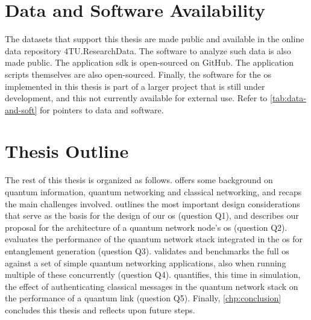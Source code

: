 \section{Data and Software Availability}

The datasets that support this thesis are made public and available in the online data repository
4TU.ResearchData. The software to analyze such data is also made public. The application
\acrfull{sdk} is open-sourced on GitHub. The application scripts themselves are also open-sourced.
Finally, the software for the \acrlong{os} implemented in this thesis is part of a larger project
that is still under development, and this not currently available for external use. Refer to
\cref{tab:data-and-soft} for pointers to data and software.

\section{Thesis Outline}

The rest of this thesis is organized as follows.  offers some background on
quantum information, quantum networking and classical networking, and recaps the main challenges
involved.  outlines the most important design considerations that serve as the basis
for the design of our \acrshort{os} (question Q1), and describes our proposal for the architecture
of a quantum network node's \acrshort{os} (question Q2).  evaluates the
performance of the quantum network stack integrated in the \acrshort{os} for entanglement generation
(question Q3).  validates and benchmarks the full \acrshort{os} against a set of
simple quantum networking applications, also when running multiple of these concurrently (question
Q4).  quantifies, this time in simulation, the effect of authenticating classical
messages in the quantum network stack on the performance of a quantum link (question Q5). Finally,
\cref{chp:conclusion} concludes this thesis and reflects upon future steps.

\begin{xstretch}
\printbibliography[heading=subbibintoc,title={References},notcategory=noprint]
\end{xstretch}
